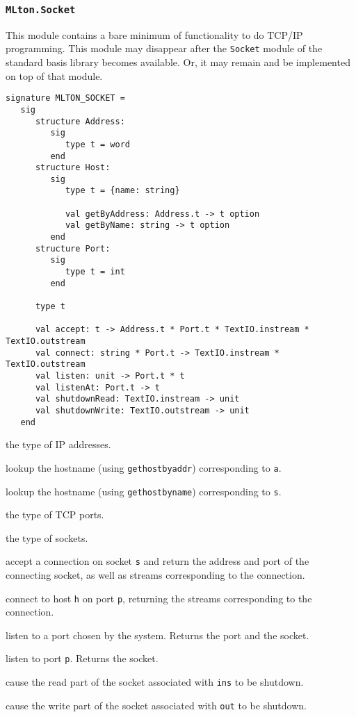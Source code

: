 \subsubsection{{\tt MLton.Socket}}
This module contains a bare minimum of functionality to do TCP/IP programming.
This module may disappear after the {\tt Socket} module of the standard basis
library becomes available.  Or, it may remain and be implemented on top of that
module. 
\begin{verbatim}
signature MLTON_SOCKET =
   sig
      structure Address:
         sig
            type t = word
         end
      structure Host:
         sig
            type t = {name: string}

            val getByAddress: Address.t -> t option
            val getByName: string -> t option
         end
      structure Port:
         sig
            type t = int
         end

      type t

      val accept: t -> Address.t * Port.t * TextIO.instream * TextIO.outstream
      val connect: string * Port.t -> TextIO.instream * TextIO.outstream
      val listen: unit -> Port.t * t
      val listenAt: Port.t -> t
      val shutdownRead: TextIO.instream -> unit
      val shutdownWrite: TextIO.outstream -> unit
   end
\end{verbatim}

\begin{description}

the type of IP addresses.

lookup the hostname (using {\tt gethostbyaddr}) corresponding to {\tt a}.

lookup the hostname (using {\tt gethostbyname}) corresponding to {\tt s}.

the type of TCP ports.

the type of sockets.

accept a connection on socket {\tt s} and return the address and
port of the connecting socket, as well as streams corresponding to the
connection.

connect to host {\tt h} on port {\tt p}, returning the streams
corresponding to the connection.

listen to a port chosen by the system.  Returns the port and the socket.

listen to port {\tt p}.  Returns the socket.

cause the read part of the socket associated with {\tt ins} to be shutdown.

cause the write part of the socket associated with {\tt out} to be shutdown.
\end{description}

